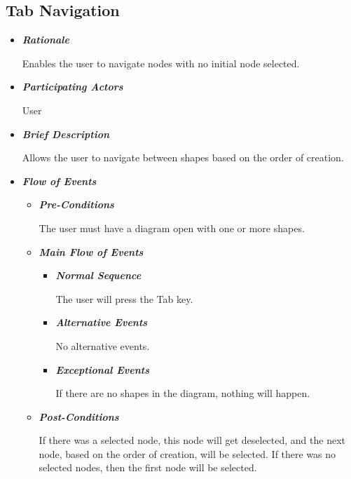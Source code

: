 \subsection{Tab Navigation}
\begin{itemize}

\item {\bf \em Rationale}
\par \noindent
Enables the user to navigate nodes with no initial node selected.

\item {\bf \em Participating Actors}
\par \noindent
User

\item {\bf \em Brief Description}
\par \noindent
Allows the user to navigate between shapes based on the order of creation.

\item {\bf \em Flow of Events}
\begin{itemize}

\item {\bf \em Pre-Conditions}
\par \noindent
The user must have a diagram open with one or more shapes.

\item {\bf \em Main Flow of Events}

\begin{itemize}

\item {\bf \em Normal Sequence}
\par \noindent
The user will press the Tab key.

\item {\bf \em Alternative Events}
\par \noindent
No alternative events.

\item {\bf \em Exceptional Events}
\par \noindent
If there are no shapes in the diagram, nothing will happen.

\end{itemize}

\item {\bf \em Post-Conditions}
\par \noindent
If there was a selected node, this node will get deselected, and the next node, based on the order of creation, will be selected. If there was no selected nodes, then the first node will be selected.


\end{itemize}
\end{itemize}
